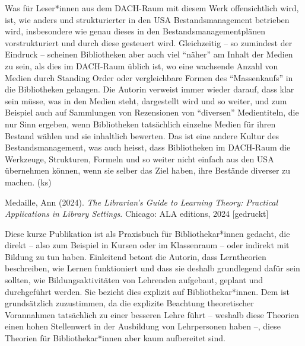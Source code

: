 \documentclass[a4paper,
fontsize=11pt,
oneside,
numbers=noperiodatend,
parskip=half-,
bibliography=totoc,
final
]{scrartcl}
\begin{document}
Was für Leser*innen aus dem DACH-Raum mit diesem Werk offensichtlich
wird, ist, wie anders und strukturierter in den USA Bestandsmanagement
betrieben wird, insbesondere wie genau dieses in den
Bestandsmanagementplänen vorstrukturiert und durch diese gesteuert wird.
Gleichzeitig -- so zumindest der Eindruck -- scheinen Bibliotheken aber
auch viel \enquote{näher} am Inhalt der Medien zu sein, als dies im
DACH-Raum üblich ist, wo eine wachsende Anzahl von Medien durch Standing
Order oder vergleichbare Formen des \enquote{Massenkaufs} in die
Bibliotheken gelangen. Die Autorin verweist immer wieder darauf, dass
klar sein müsse, was in den Medien steht, dargestellt wird und so
weiter, und zum Beispiel auch auf Sammlungen von Rezensionen von
\enquote{diversen} Medientiteln, die nur Sinn ergeben, wenn Bibliotheken
tatsächlich einzelne Medien für ihren Bestand wählen und sie inhaltlich
bewerten. Das ist eine andere Kultur des Bestandsmanagement, was auch
heisst, dass Bibliotheken im DACH-Raum die Werkzeuge, Strukturen,
Formeln und so weiter nicht einfach aus den USA übernehmen können, wenn
sie selber das Ziel haben, ihre Bestände diverser zu machen. (ks)

Medaille, Ann (2024). \emph{The Librarian's Guide to Learning Theory:
Practical Applications in Library Settings}. Chicago: ALA editions, 2024
{[}gedruckt{]}

Diese kurze Publikation ist als Praxisbuch für Bibliothekar*innen
gedacht, die direkt -- also zum Beispiel in Kursen oder im Klassenraum
-- oder indirekt mit Bildung zu tun haben. Einleitend betont die
Autorin, dass Lerntheorien beschreiben, wie Lernen funktioniert und dass
sie deshalb grundlegend dafür sein sollten, wie Bildungsaktivitäten von
Lehrenden aufgebaut, geplant und durchgeführt werden. Sie bezieht dies
explizit auf Bibliothekar*innen. Dem ist grundsätzlich zuzustimmen, da
die explizite Beachtung theoretischer Vorannahmen tatsächlich zu einer
besseren Lehre führt -- weshalb diese Theorien einen hohen Stellenwert
in der Ausbildung von Lehrpersonen haben --, diese Theorien für
Bibliothekar*innen aber kaum aufbereitet sind.
\end{document}
